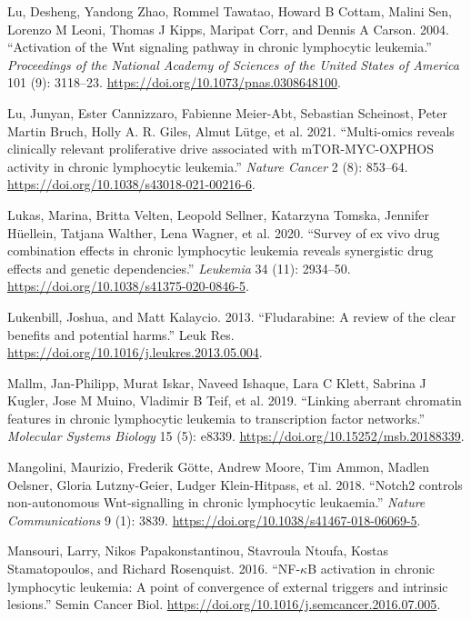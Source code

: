 \documentclass[11pt, a4paper, twosided]{book}
\newenvironment{CSLReferences}%
  {}%
  {\par}
\begin{document}
\begin{CSLReferences}{1}{0}
\leavevmode{}%
Lu, Desheng, Yandong Zhao, Rommel Tawatao, Howard B Cottam, Malini Sen, Lorenzo M Leoni, Thomas J Kipps, Maripat Corr, and Dennis A Carson. 2004. {``{Activation of the Wnt signaling pathway in chronic lymphocytic leukemia}.''} \emph{Proceedings of the National Academy of Sciences of the United States of America} 101 (9): 3118--23. \url{https://doi.org/10.1073/pnas.0308648100}.

\leavevmode{}%
Lu, Junyan, Ester Cannizzaro, Fabienne Meier-Abt, Sebastian Scheinost, Peter Martin Bruch, Holly A. R. Giles, Almut Lütge, et al. 2021. {``{Multi-omics reveals clinically relevant proliferative drive associated with mTOR-MYC-OXPHOS activity in chronic lymphocytic leukemia}.''} \emph{Nature Cancer} 2 (8): 853--64. \url{https://doi.org/10.1038/s43018-021-00216-6}.

\leavevmode{}%
Lukas, Marina, Britta Velten, Leopold Sellner, Katarzyna Tomska, Jennifer Hüellein, Tatjana Walther, Lena Wagner, et al. 2020. {``{Survey of ex vivo drug combination effects in chronic lymphocytic leukemia reveals synergistic drug effects and genetic dependencies}.''} \emph{Leukemia} 34 (11): 2934--50. \url{https://doi.org/10.1038/s41375-020-0846-5}.

\leavevmode{}%
Lukenbill, Joshua, and Matt Kalaycio. 2013. {``{Fludarabine: A review of the clear benefits and potential harms}.''} Leuk Res. \url{https://doi.org/10.1016/j.leukres.2013.05.004}.

\leavevmode{}%
Mallm, Jan-Philipp, Murat Iskar, Naveed Ishaque, Lara C Klett, Sabrina J Kugler, Jose M Muino, Vladimir B Teif, et al. 2019. {``{Linking aberrant chromatin features in chronic lymphocytic leukemia to transcription factor networks.}''} \emph{Molecular Systems Biology} 15 (5): e8339. \url{https://doi.org/10.15252/msb.20188339}.

\leavevmode{}%
Mangolini, Maurizio, Frederik Götte, Andrew Moore, Tim Ammon, Madlen Oelsner, Gloria Lutzny-Geier, Ludger Klein-Hitpass, et al. 2018. {``{Notch2 controls non-autonomous Wnt-signalling in chronic lymphocytic leukaemia}.''} \emph{Nature Communications} 9 (1): 3839. \url{https://doi.org/10.1038/s41467-018-06069-5}.

\leavevmode{}%
Mansouri, Larry, Nikos Papakonstantinou, Stavroula Ntoufa, Kostas Stamatopoulos, and Richard Rosenquist. 2016. {``{NF-\(\kappa\)B activation in chronic lymphocytic leukemia: A point of convergence of external triggers and intrinsic lesions}.''} Semin Cancer Biol. \url{https://doi.org/10.1016/j.semcancer.2016.07.005}.


\end{CSLReferences}
\end{document}
